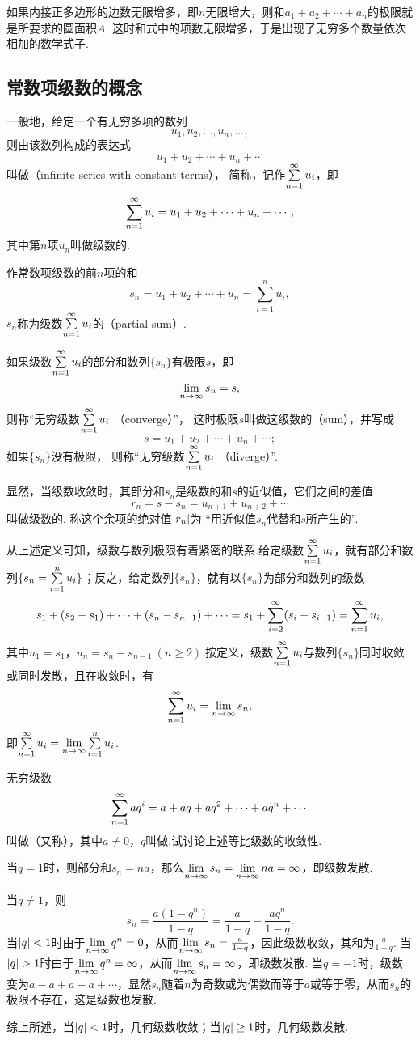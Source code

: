 如果内接正多边形的边数无限增多，即\(n\)无限增大，则和\(a_1+a_2+\dotsb+a_n\)的极限就是所要求的圆面积\(A\).
这时和式中的项数无限增多，于是出现了无穷多个数量依次相加的数学式子.

\subsection{常数项级数的概念}
\begin{definition}\label{definition:无穷级数.常数项级数的定义}
一般地，给定一个有无穷多项的数列\[
u_1,u_2,\dotsc,u_n,\dotsc,
\]则由该数列构成的表达式\[
u_1+u_2+\dotsb+u_n+\dotsb
\]叫做（infinite series with constant terms），%
简称，记作\(\sum\limits_{n=1}^\infty u_i\)，即\[
\sum\limits_{n=1}^\infty u_i
= u_1+u_2+\dotsb+u_n+\dotsb,
\]
其中第\(n\)项\(u_n\)叫做级数的.

作常数项级数的前\(n\)项的和\[
s_n = u_1+u_2+\dotsb+u_n = \sum\limits_{i=1}^n{u_i},
\]\(s_n\)称为级数\(\sum\limits_{n=1}^\infty u_i\)的（partial sum）.

如果级数\(\sum\limits_{n=1}^\infty u_i\)的部分和数列\(\{s_n\}\)有极限\(s\)，即\[
\lim\limits_{n\to\infty} s_n = s,
\]则称“无穷级数\(\sum\limits_{n=1}^\infty u_i\) （converge）”，%
这时极限\(s\)叫做这级数的（sum），并写成\[
s = u_1+u_2+\dotsb+u_n+\dotsb;
\]如果\(\{s_n\}\)没有极限，%
则称“无穷级数\(\sum\limits_{n=1}^\infty u_i\) （diverge）”.

显然，当级数收敛时，其部分和\(s_n\)是级数的和\(s\)的近似值，它们之间的差值\[
r_n = s - s_n = u_{n+1}+u_{n+2}+\dotsb
\]叫做级数的.
称这个余项的绝对值\(\abs{r_n}\)为%
“用近似值\(s_n\)代替和\(s\)所产生的”.
\end{definition}
从上述定义可知，级数与数列极限有着紧密的联系.给定级数\(\sum\limits_{n=1}^\infty u_i\)，就有部分和数列\(\{s_n = \sum\limits_{i=1}^n u_i\}\)；反之，给定数列\(\{s_n\}\)，就有以\(\{s_n\}\)为部分和数列的级数\[
s_1 + (s_2-s_1) + \dotsb + (s_n-s_{n-1}) + \dotsb
= s_1 + \sum\limits_{i=2}^\infty (s_i-s_{i-1})
= \sum\limits_{n=1}^\infty u_i,
\]其中\(u_1=s_1\)，\(u_n=s_n-s_{n-1}\ (n \geq 2)\).按定义，级数\(\sum\limits_{n=1}^\infty u_i\)与数列\(\{s_n\}\)同时收敛或同时发散，且在收敛时，有\[
\sum\limits_{n=1}^\infty u_i = \lim\limits_{n\to\infty} s_n,
\]即\(\sum\limits_{n=1}^\infty u_i = \lim\limits_{n\to\infty} \sum\limits_{i=1}^n u_i\).

\begin{example}\label{example:无穷级数.等比级数的收敛性}
无穷级数\[
\sum\limits_{n=1}^\infty a q^i = a+aq+aq^2+\dotsb+aq^n+\dotsb
\]叫做（又称），其中\(a \neq 0\)，\(q\)叫做.试讨论上述等比级数的收敛性.
\begin{solution}
当\(q = 1\)时，则部分和\(s_n=na\)，那么\(\lim\limits_{n\to\infty} s_n = \lim\limits_{n\to\infty} na = \infty\)，即级数发散.

当\(q \neq 1\)，则\[
s_n = \frac{a(1-q^n)}{1-q} = \frac{a}{1-q} - \frac{aq^n}{1-q}.
\]
当\(\abs{q} < 1\)时由于\(\lim\limits_{n\to\infty} q^n=0\)，从而\(\lim\limits_{n\to\infty} s_n=\frac{a}{1-q}\)，因此级数收敛，其和为\(\frac{a}{1-q}\).
当\(\abs{q} > 1\)时由于\(\lim\limits_{n\to\infty} q^n=\infty\)，从而\(\lim\limits_{n\to\infty} s_n=\infty\)，即级数发散.
当\(q = -1\)时，级数变为\(a-a+a-a+\dotsb\)，显然\(s_n\)随着\(n\)为奇数或为偶数而等于\(a\)或等于零，从而\(s_n\)的极限不存在，这是级数也发散.

综上所述，{\color{red}当\(\abs{q} < 1\)时，几何级数收敛；当\(\abs{q} \geq 1\)时，几何级数发散.}
\end{solution}
\end{example}

